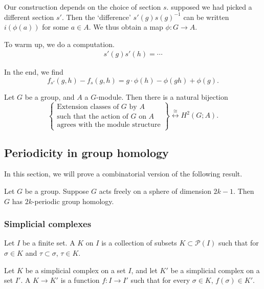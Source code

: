 \documentclass[main.tex]{subfiles}
\begin{document}
Our construction depends on the choice of section $s$. supposed we had picked a different section $s'$. Then the `difference' $s'(g)s(g)^{-1}$ can be written $i(\phi(a))$ for some $a \in A$. We thus obtain a map $\phi\colon G \to A$.

To warm up, we do a computation.
\begin{align*}
  s'(g)s'(h) = \cdots
\end{align*}

In the end, we find
\begin{equation*}
  f_{s'}(g, h) - f_{s}(g, h) = g\cdot \phi(h) - \phi(gh) + \phi(g).
\end{equation*}

\begin{theorem}
  Let $G$ be a group, and $A$ a $G$-module. Then there is a natural bijection
  \begin{equation*}
    \left\{
      \substack{\text{Extension classes of $G$ by $A$} \\ \text{such that the action of $G$ on $A$} \\ \text{agrees with the module structure}}
    \right\}
    \overset{\cong}{\longleftrightarrow}
    H^{2}(G; A).
  \end{equation*}
\end{theorem}

\subsection{Periodicity in group homology}
\label{ssc:periodicity_in_group_homology}

In this section, we will prove a combinatorial version of the following result.

\begin{fact}
  \label{fact:periodicity_in_group_homology}
  Let $G$ be a group. Suppose $G$ acts freely on a sphere of dimension $2k-1$. Then $G$ has $2k$-periodic group homology.
\end{fact}

\subsubsection{Simplicial complexes}
\label{sss:simplicial_complexes}

\begin{definition}
  \label{def:simplicial_complex}
  Let $I$ be a finite set. A  $K$ on $I$ is a collection of subsets $K \subset \mathcal{P}(I)$ such that for $\sigma \in K$ and $\tau \subset \sigma$, $\tau \in K$.

  Let $K$ be a simplicial complex on a set $I$, and let $K'$ be a simplicial complex on a set $I'$. A  $K \to K'$ is a function $f\colon I \to I'$ such that for every $\sigma \in K$, $f(\sigma) \in K'$.
\end{definition}
\end{document}

